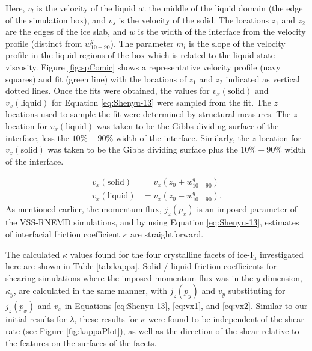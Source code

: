Here, $v_{l}$ is the velocity of the liquid at the middle of the
liquid domain (the edge of the simulation box), and $v_{s}$ is the
velocity of the solid. The locations $z_{1}$ and $z_{2}$ are the edges
of the ice slab, and $w$ is the width of the interface from the
velocity profile (distinct from $w_{10-90}^{q}$). The parameter
$m_{l}$ is the slope of the velocity profile in the liquid regions of
the box which is related to the liquid-state viscosity. Figure
\ref{fig:spComic} shows a representative velocity profile (navy
squares) and fit (green line) with the locations of $z_{1}$ and
$z_{2}$ indicated as vertical dotted lines. Once the fits were
obtained, the values for $v_{x}(\mathrm{solid})$ and
$v_{x}(\mathrm{liquid})$ for Equation \eqref{eq:Shenyu-13} were
sampled from the fit. The $z$ locations used to sample the fit were
determined by structural measures. The $z$ location for
$v_{x}(\mathrm{liquid})$ was taken to be the Gibbs dividing surface of
the interface, less the $10\%-90\%$ width of the interface. Similarly,
the $z$ location for $v_{x}(\mathrm{solid})$ was taken to be the Gibbs
dividing surface plus the $10\%-90\%$ width of the interface.

\begin{align}
v_{x}(\mathrm{solid}) & = v_{x}( z_0 + w_\mathrm{10-90}^{q})  \label{eq:vx1}\\
v_{x}(\mathrm{liquid}) & = v_{x}( z_0 - w_\mathrm{10-90}^{q}). \label{eq:vx2}
\end{align}
As mentioned earlier, the momentum flux, $j_{z}(p_{x})$ is an imposed
parameter of the VSS-RNEMD simulations, and by using
Equation \eqref{eq:Shenyu-13}, estimates of interfacial friction
coefficient $\kappa$ are straightforward.

The calculated $\kappa$ values found for the four crystalline facets
of ice-I$_\mathrm{h}$ investigated here are shown in Table
\ref{tab:kappa}. Solid / liquid friction coefficients for shearing
simulations where the imposed momentum flux was in the $y$-dimension,
$\kappa_{y}$, are calculated in the same manner, with $j_{z}(p_{y})$
and $v_{y}$ substituting for $j_{z}(p_{x})$ and $v_{x}$ in
Equations \eqref{eq:Shenyu-13}, \eqref{eq:vx1}, and \eqref{eq:vx2}.
Similar to our initial results for $\lambda$, these results
for $\kappa$ were found to be independent of the shear rate (see
Figure \ref{fig:kappaPlot}), as well as the direction of the shear
relative to the features on the surfaces of the facets.


